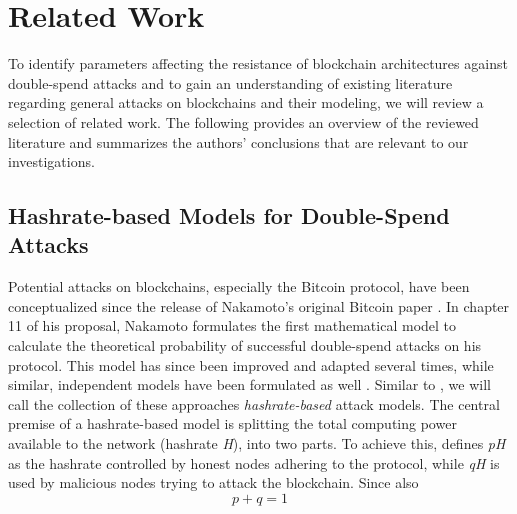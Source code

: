 \documentclass[a4paper,12pt,twoside]{report}
\begin{document}

\chapter{Related Work} \label{relatedwork}
To identify parameters affecting the resistance of blockchain architectures against double-spend attacks and to gain an understanding of existing literature regarding general attacks on blockchains and their modeling, we will review a selection of related work. The following provides an overview of the reviewed literature and summarizes the authors' conclusions that are relevant to our investigations.
\section{Hashrate-based Models for Double-Spend Attacks}
Potential attacks on blockchains, especially the Bitcoin protocol, have been conceptualized since the release of Nakamoto's original Bitcoin paper \cite{nakamoto2008bitcoin}. In chapter 11 of his proposal, Nakamoto formulates the first mathematical model to calculate the theoretical probability of successful double-spend attacks on his protocol. This model has since been improved and adapted several times, while similar, independent models have been formulated as well \cite{HBDSA,DSAwithTime,NakamotoDSACorrection,NakamotoExplMCSim}. Similar to \cite{DSAwithTime}, we will call the collection of these approaches \textit{hashrate-based} attack models. The central premise of a hashrate-based model is splitting the total computing power available to the network (hashrate \textit{H}), into two parts. To achieve this, \cite{HBDSA} defines \textit{pH} as the hashrate controlled by honest nodes adhering to the protocol, while \textit{qH} is used by malicious nodes trying to attack the blockchain. Since also
\begin{equation}
p + q = 1
\end{equation}
\end{document}

